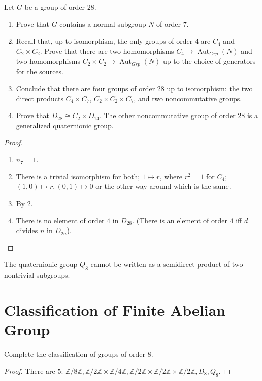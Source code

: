 \documentclass[openany]{book}
\newcommand{\Z}{\mathbb{Z}}
\begin{document}
    \begin{prob}[5.15]
    Let $G$ be a group of order 28.
    
    \begin{enumerate}
        \item Prove that $G$ contains a normal subgroup $N$ of order 7.
        \item Recall that, up to isomorphism, the only groups of order 4 are $C_4$ and $C_2 \times C_2$. Prove that there are two homomorphisms $C_4 \to \operatorname{Aut}_{Grp}(N)$ and two homomorphisms $C_2 \times C_2 \to \operatorname{Aut}_{Grp}(N)$ up to the choice of generators for the sources.
        \item Conclude that there are four groups of order 28 up to isomorphism: the two direct products $C_4 \times C_7$, $C_2 \times C_2 \times C_7$, and two noncommutative groups.
        \item Prove that $D_{28} \cong C_2 \times D_{14}$. The other noncommutative group of order 28 is a generalized quaternionic group.
    \end{enumerate}
    \end{prob}
\begin{proof}
    \begin{enumerate}
        \item $n_7=1$.
        \item There is a trivial isomorphism for both; $1\mapsto r$, where $r^2=1$ for $C_4$; $(1,0)\mapsto r, (0,1)\mapsto 0$ or the other way around which is the same.
        \item By 2.
        \item There is no element of order $4$ in $D_{28}$. (There is an element of order $4$ iff $d$ divides $n$ in $D_{2n}$).
    \end{enumerate}
\end{proof}
    
    \begin{prop}[5.16]
    The quaternionic group $Q_8$  cannot be written as a semidirect product of two nontrivial subgroups.
    \end{prop}



\section{Classification of Finite Abelian Group}




\begin{prob}
Complete the classification of groups of order 8.
\end{prob}
\begin{proof}
    There are $5$: $\Z/8\Z, \Z/2\Z\times\Z/4\Z, \Z/2\Z\times\Z/2\Z\times\Z/2\Z, D_8,Q_8$.
\end{proof}
\end{document}
